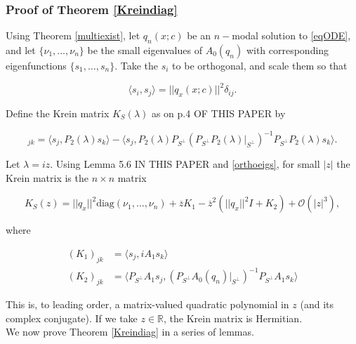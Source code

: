 \documentclass[12pt]{article}
\def\R{{\mathbb R}}
\begin{document}
\subsubsection{Proof of Theorem \ref{Kreindiag}}

Using Theorem \ref{multiexist}, let $q_n(x; c)$ be an $n-$modal solution to \eqref{eqODE}, and let $\{\nu_1, \dots, \nu_n\}$ be the small eigenvalues of $A_0(q_n)$ with corresponding eigenfunctions $\{ s_1, \dots, s_n \}$. Take the $s_i$ to be orthogonal, and scale them so that

\begin{equation}\label{orthoeigs}
\langle s_i, s_j \rangle = ||q_x(x; c)||^2 \delta_{ij}.
\end{equation}

Define the Krein matrix $K_S(\lambda)$ as on p.4 OF THIS PAPER by 

\begin{equation}
[K_S(\lambda)]_{jk} = 
\langle s_j , P_2(\lambda)s_k\rangle 
- \langle s_j , P_2(\lambda) P_{S^{\perp}} (P_{S^{\perp}} P_2(\lambda)|_{S^{\perp}} )^{-1} P_{S^{\perp}} P_2(\lambda) s_k \rangle.
\end{equation}

Let $\lambda = i z$. Using Lemma 5.6 IN THIS PAPER and \eqref{orthoeigs}, for small $|z|$ the Krein matrix is the $n \times n$ matrix

\begin{equation}\label{Kreinform}
K_S(z) = ||q_x||^2 \text{diag}(\nu_1, \dots, \nu_n) + \overline{z} K_1 
- \overline{z}^2 ( ||q_x||^2 I + K_2) + \mathcal{O}(|z|^3),
\end{equation}

where

\begin{align}
(K_1)_{jk} &= \langle s_j, i A_1 s_k \rangle \label{defK1} \\
(K_2)_{jk} &= \langle P_{S^\perp} A_1 s_j, (P_{S^\perp} A_0(q_n)|_{S^\perp})^{-1} P_{S^\perp} A_1 s_k \rangle \label{defK2}
\end{align}

This is, to leading order, a matrix-valued quadratic polynomial in $z$ (and its complex conjugate). If we take $z \in \R$, the Krein matrix is Hermitian.\\

We now prove Theorem \ref{Kreindiag} in a series of lemmas. 

\end{document}
